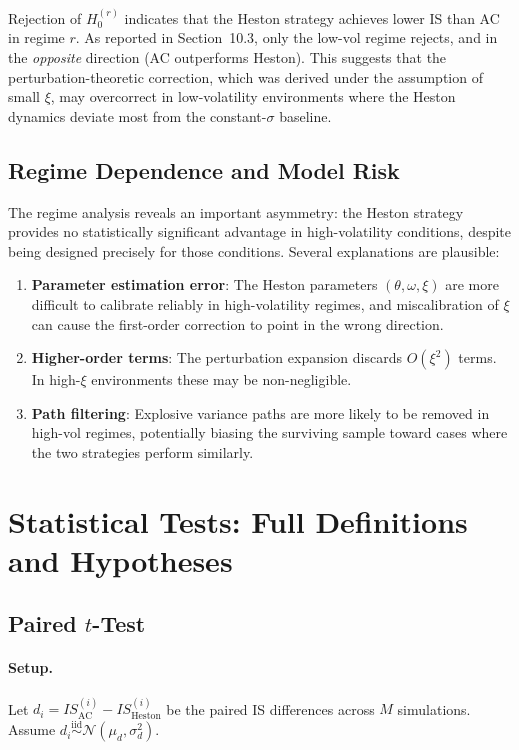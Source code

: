 \documentclass[11pt]{article}
\begin{document}
Rejection of $H_0^{(r)}$ indicates that the Heston strategy achieves lower IS than AC in regime $r$. As reported in Section~10.3, only the low-vol regime rejects, and in the \emph{opposite} direction (AC outperforms Heston). This suggests that the perturbation-theoretic correction, which was derived under the assumption of small $\xi$, may overcorrect in low-volatility environments where the Heston dynamics deviate most from the constant-$\sigma$ baseline.

\subsection{Regime Dependence and Model Risk}

The regime analysis reveals an important asymmetry: the Heston strategy provides no statistically significant advantage in high-volatility conditions, despite being designed precisely for those conditions. Several explanations are plausible:

\begin{enumerate}[label=(\roman*)]
\item \textbf{Parameter estimation error}: The Heston parameters $(\theta, \omega, \xi)$ are more difficult to calibrate reliably in high-volatility regimes, and miscalibration of $\xi$ can cause the first-order correction to point in the wrong direction.
\item \textbf{Higher-order terms}: The perturbation expansion discards $O(\xi^2)$ terms. In high-$\xi$ environments these may be non-negligible.
\item \textbf{Path filtering}: Explosive variance paths are more likely to be removed in high-vol regimes, potentially biasing the surviving sample toward cases where the two strategies perform similarly.
\end{enumerate}

\section{Statistical Tests: Full Definitions and Hypotheses}
\label{app:stats}

\subsection{Paired $t$-Test}

\paragraph{Setup.} Let $d_i = IS_{\text{AC}}^{(i)} - IS_{\text{Heston}}^{(i)}$ be the paired IS differences across $M$ simulations. Assume $d_i \overset{\text{iid}}{\sim} \mathcal{N}(\mu_d, \sigma_d^2)$.
\end{document}
